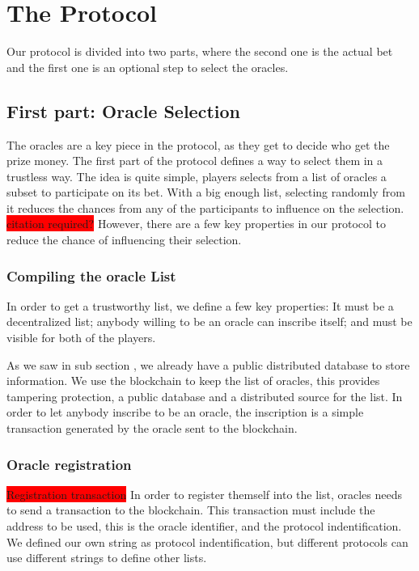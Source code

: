 \section{The Protocol}

Our protocol is divided into two parts, where the second one is the actual bet
  and the first one is an optional step to select the oracles.

\subsection{First part: Oracle Selection}

The oracles are a key piece in the protocol, as they get to decide who get
  the prize money.
The first part of the protocol defines a way to select them in a trustless
  way.
The idea is quite simple, players selects from a list of oracles a subset
  to participate on its bet.
With a big enough list, selecting randomly from it reduces the
  chances from any of the participants to influence on the selection.
\colorbox{red}{citation required?}
However, there are a few key properties in our protocol to reduce the chance
  of influencing their selection.

\subsubsection{Compiling the oracle List}

In order to get a trustworthy list, we define a few key properties:
It must be a decentralized list; anybody willing to be an oracle can inscribe
  itself; and must be visible for both of the players.

As we saw in sub section \label{subsec:Blockchain}, we already have a
  public distributed database to store information.
We use the blockchain to keep the list of oracles, this provides tampering
  protection, a public database and a distributed source for the list.
In order to let anybody inscribe to be an oracle, the inscription is a simple
 transaction generated by the oracle sent to the blockchain.

\subsubsection{Oracle registration}
\colorbox{red}{Registration transaction}
In order to register themself into the list, oracles needs to send a transaction
  to the blockchain.
This transaction must include the address to be used, this is the oracle
  identifier, and the protocol indentification.
We defined our own string as protocol indentification, but different protocols
  can use different strings to define other lists.

